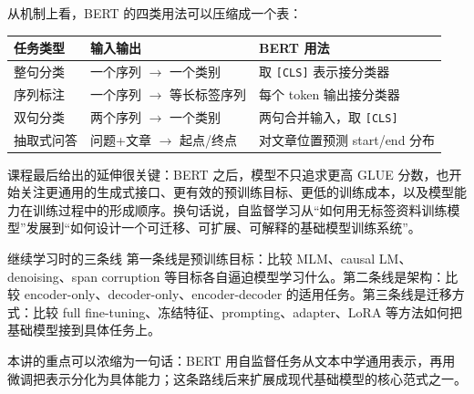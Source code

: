 \documentclass[a4paper]{article}
\begin{document}
从机制上看，BERT 的四类用法可以压缩成一个表：

\begin{center}
\begin{tabular}{L{0.22\textwidth} L{0.30\textwidth} L{0.34\textwidth}}
\toprule
任务类型 & 输入输出 & BERT 用法 \\
\midrule
整句分类 & 一个序列 $\rightarrow$ 一个类别 & 取 \texttt{[CLS]} 表示接分类器 \\
序列标注 & 一个序列 $\rightarrow$ 等长标签序列 & 每个 token 输出接分类器 \\
双句分类 & 两个序列 $\rightarrow$ 一个类别 & 两句合并输入，取 \texttt{[CLS]} \\
抽取式问答 & 问题+文章 $\rightarrow$ 起点/终点 & 对文章位置预测 start/end 分布 \\
\bottomrule
\end{tabular}
\end{center}

课程最后给出的延伸很关键：BERT 之后，模型不只追求更高 GLUE 分数，也开始关注更通用的生成式接口、更有效的预训练目标、更低的训练成本，以及模型能力在训练过程中的形成顺序。换句话说，自监督学习从“如何用无标签资料训练模型”发展到“如何设计一个可迁移、可扩展、可解释的基础模型训练系统”。

\begin{knowledgebox}{继续学习时的三条线}
    第一条线是预训练目标：比较 MLM、causal LM、denoising、span corruption 等目标各自逼迫模型学习什么。第二条线是架构：比较 encoder-only、decoder-only、encoder-decoder 的适用任务。第三条线是迁移方式：比较 full fine-tuning、冻结特征、prompting、adapter、LoRA 等方法如何把基础模型接到具体任务上。
\end{knowledgebox}

本讲的重点可以浓缩为一句话：BERT 用自监督任务从文本中学通用表示，再用微调把表示分化为具体能力；这条路线后来扩展成现代基础模型的核心范式之一。
\end{document}
